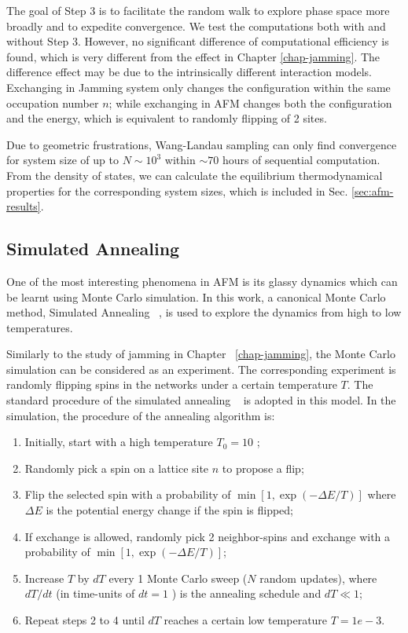 The goal of Step 3 is to facilitate the random walk to explore phase space more broadly and to expedite convergence. We test the computations both with and without Step 3. However, no significant difference of computational efficiency is found, which is very different from the effect in Chapter \ref{chap-jamming}. The difference effect may be due to the intrinsically different interaction models. Exchanging in Jamming system only changes the configuration within the same occupation number $n$; while exchanging in AFM changes both the configuration and the energy, which is equivalent to randomly flipping of 2 sites.  

Due to geometric frustrations, Wang-Landau sampling can only find convergence for system size of up to $N\sim10^{3}$ within $\sim70$ hours of sequential computation. From the density of states, we can calculate the equilibrium thermodynamical properties for the corresponding system sizes, which is included in Sec. \ref{sec:afm-results}. 

\subsection{Simulated Annealing}
One of the most interesting phenomena in AFM is its glassy dynamics which can be learnt using Monte Carlo simulation. In this work, a canonical Monte Carlo method, Simulated Annealing ~\cite{SA}, is used to explore the dynamics from high to low temperatures. 

Similarly to the study of jamming in Chapter ~\ref{chap-jamming}, the Monte Carlo simulation can be considered as an experiment. The corresponding experiment is randomly flipping spins in the networks under a certain temperature $T$.  The standard procedure of the simulated annealing ~\cite{Vcerny1985} is adopted in this model. In the simulation, the procedure of the annealing algorithm is: 
\begin{enumerate}
\item Initially, start with a high temperature $T_{0}=10$ ; 
\item Randomly pick a spin on a lattice site $n$ to propose a flip; 
\item Flip the selected spin with a probability of $\min\left[1, \exp(-\Delta E /T)\right]$ 
where $\Delta E$ is the potential energy change if the spin is flipped; 
\item If exchange is allowed, randomly pick 2 neighbor-spins and exchange with a probability of $\min\left[1, \exp(-\Delta E /T)\right]$; 
\item Increase $T$ by $dT$ every 1 Monte Carlo sweep ($N$ random
updates), where $dT/dt$ (in time-units of $dt=1$ ) is the annealing
schedule and $dT\ll1$; 
\item Repeat steps 2 to 4 until $dT$ reaches a certain low temperature $T=1e-3$. 
\end{enumerate}

